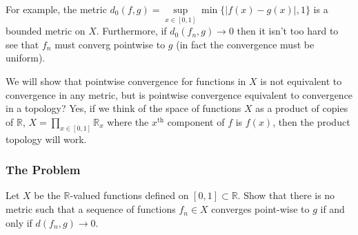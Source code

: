 For example, the metric \(d_0(f, g) = \sup\limits_{x\in [0,1]} \min \{|f(x) - g(x)|, 1\}\) is a bounded metric on \(X\).
Furthermore, if \(d_0(f_n, g) \to 0\) then it isn't too hard to see that \(f_n\) must converg pointwise to \(g\) 
(in fact the convergence must be uniform). 

We will show that pointwise convergence for functions in \(X\) is not equivalent to convergence in any metric, but is
pointwise convergence equivalent to convergence in a topology? Yes, if we think of the space of functions \(X\) as a 
product of copies of \(\mathbb R\),  \(X = \prod\limits_{x\in [0,1]} \mathbb R_x\) where the \(x^\text{th}\) 
component of \(f\) is \(f(x)\), then the product topology will work. 

\subsubsection*{The Problem}

Let \(X\) be the \(\mathbb R\)-valued functions defined on \([0,1]\subset\mathbb R\). Show that there is no metric
such that a sequence of functions \(f_n \in X\) converges point-wise to \(g\) if and only if \(d(f_n, g) \to 0\). 
